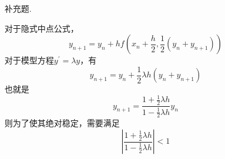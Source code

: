 \documentclass{sjtuarticle}
\begin{document}
\begin{itemize}
    \item[补充题.] \begin{solution}
        对于隐式中点公式，
        \begin{equation*}
            y_{n+1}=y_n+hf\left(x_n+\frac{h}{2},\frac{1}{2}(y_n+y_{n+1})\right)
        \end{equation*}
        对于模型方程$y^\prime=\lambda y$，有
        \begin{equation*}
            y_{n+1}=y_n+\frac{1}{2}\lambda h(y_n+y_{n+1})
        \end{equation*}
        也就是
        \begin{equation*}
            y_{n+1}=\frac{1+\frac{1}{2}\lambda h}{1-\frac{1}{2}\lambda h}y_n
        \end{equation*}
        则为了使其绝对稳定，需要满足
        \begin{equation*}
            \left|\frac{1+\frac{1}{2}\lambda h}{1-\frac{1}{2}\lambda h}\right|<1
        \end{equation*}
    \end{solution}
\end{itemize}
\end{document}
